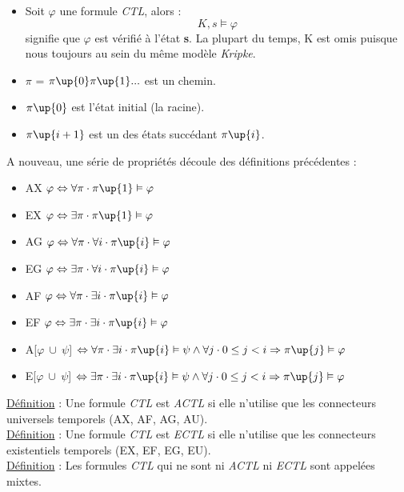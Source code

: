 \documentclass[runningheads,a4paper]{llncs}
\begin{document}
\begin{itemize}
\item Soit $\varphi$ une formule \textit{CTL}, alors : $$K, s \vDash \varphi$$ signifie que $\varphi$ est vérifié à l'état \textbf{s}. La plupart du temps, K est omis puisque nous toujours au sein du même modèle \textit{Kripke}.\\
\item $\pi$ = $\pi\up{0} \pi\up{1} ...$ est un chemin.
\item $\pi\up{0}$ est l'état initial (la racine).
\item $\pi\up{i+1}$ est un des états succédant $\pi\up{i}$.\\
\end{itemize}

\noindent A nouveau, une série de propriétés découle des définitions précédentes : 
\begin{itemize}
\item AX $\varphi \Leftrightarrow \forall \pi \cdot \pi\up{1} \vDash \varphi$
\item EX $\varphi \Leftrightarrow \exists \pi \cdot \pi\up{1} \vDash \varphi$
\item AG $\varphi \Leftrightarrow \forall \pi \cdot \forall i \cdot \pi\up{i} \vDash \varphi$
\item EG $\varphi \Leftrightarrow \exists \pi \cdot \forall i \cdot \pi\up{i} \vDash \varphi$
\item AF $\varphi \Leftrightarrow \forall \pi \cdot \exists i \cdot \pi\up{i} \vDash \varphi$
\item EF $\varphi \Leftrightarrow \exists \pi \cdot \exists i \cdot \pi\up{i} \vDash \varphi$
\item A[$\varphi \ \cup \ \psi$]  $\Leftrightarrow \forall \pi \cdot \exists i \cdot \pi\up{i} \vDash 	\psi \land \forall j \cdot 0 \leq j < i \Rightarrow \pi\up{j} \vDash \varphi$
\item E[$\varphi \ \cup \ \psi$]  $\Leftrightarrow \exists \pi \cdot \exists i \cdot \pi\up{i} \vDash 	\psi \land \forall j \cdot 0 \leq j < i \Rightarrow \pi\up{j} \vDash \varphi$ \\
\end{itemize}

\noindent \underline{Définition} : Une formule \textit{CTL} est \textit{ACTL} si elle n'utilise que les connecteurs universels temporels (AX, AF, AG, AU).\\
\underline{Définition} : Une formule \textit{CTL} est \textit{ECTL} si elle n'utilise que les connecteurs existentiels temporels (EX, EF, EG, EU).\\
\underline{Définition} : Les formules \textit{CTL} qui ne sont ni \textit{ACTL} ni \textit{ECTL} sont appelées mixtes.\\
\end{document}
